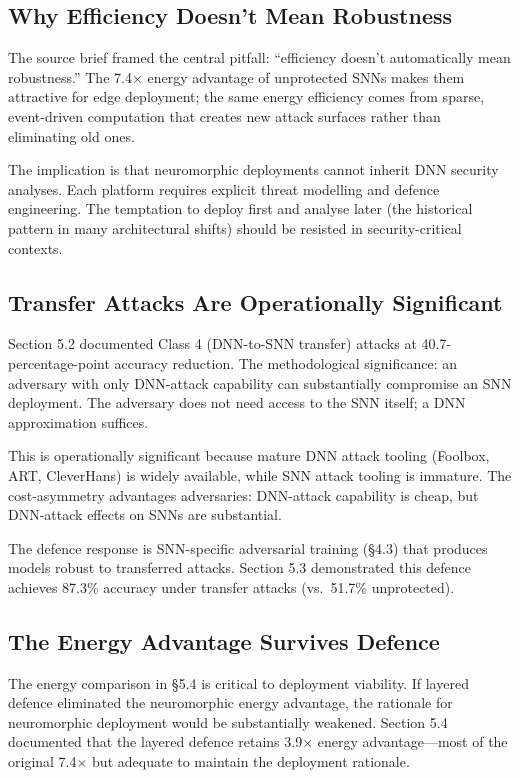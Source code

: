 \documentclass[sigconf,nonacm]{acmart}
\begin{document}
\subsection{Why Efficiency Doesn't Mean Robustness}

The source brief framed the central pitfall: ``efficiency doesn't
automatically mean robustness.'' The 7.4$\times$ energy advantage
of unprotected SNNs makes them attractive for edge deployment;
the same energy efficiency comes from sparse, event-driven
computation that creates new attack surfaces rather than
eliminating old ones.

The implication is that neuromorphic deployments cannot inherit
DNN security analyses. Each platform requires explicit threat
modelling and defence engineering. The temptation to deploy first
and analyse later (the historical pattern in many architectural
shifts) should be resisted in security-critical contexts.

\subsection{Transfer Attacks Are Operationally Significant}

Section 5.2 documented Class 4 (DNN-to-SNN transfer) attacks at
40.7-percentage-point accuracy reduction. The methodological
significance: an adversary with only DNN-attack capability can
substantially compromise an SNN deployment. The adversary does
not need access to the SNN itself; a DNN approximation suffices.

This is operationally significant because mature DNN attack
tooling (Foolbox, ART, CleverHans) is widely available, while SNN
attack tooling is immature. The cost-asymmetry advantages
adversaries: DNN-attack capability is cheap, but DNN-attack
effects on SNNs are substantial.

The defence response is SNN-specific adversarial training (§4.3)
that produces models robust to transferred attacks. Section 5.3
demonstrated this defence achieves 87.3\% accuracy under transfer
attacks (vs.\ 51.7\% unprotected).

\subsection{The Energy Advantage Survives Defence}

The energy comparison in §5.4 is critical to deployment
viability. If layered defence eliminated the neuromorphic energy
advantage, the rationale for neuromorphic deployment would be
substantially weakened. Section 5.4 documented that the layered
defence retains 3.9$\times$ energy advantage---most of the original
7.4$\times$ but adequate to maintain the deployment rationale.
\end{document}
